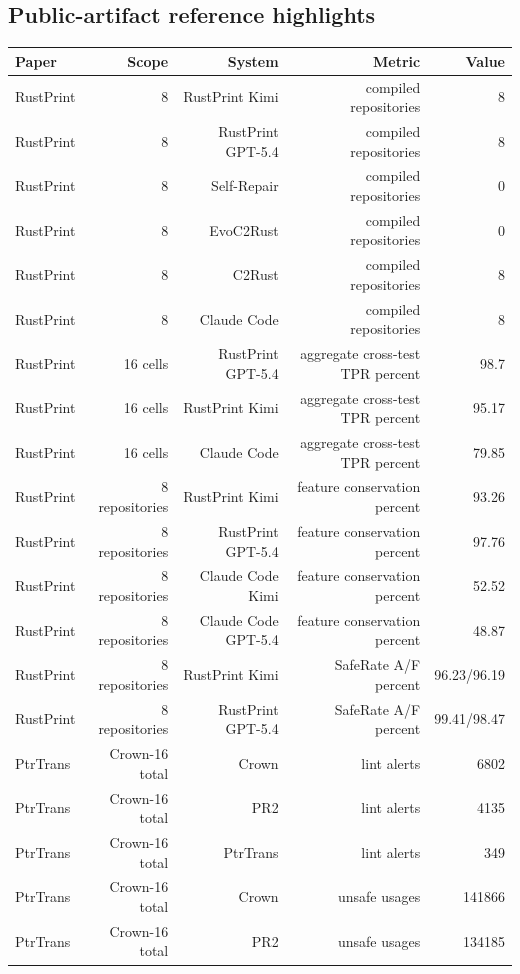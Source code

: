 \documentclass{article}
\begin{document}
\subsection*{Public-artifact reference highlights}

\begin{tabular}{lrrrr}
\toprule
Paper & Scope & System & Metric & Value \\
\midrule
RustPrint & 8 & RustPrint Kimi & compiled repositories & 8 \\
RustPrint & 8 & RustPrint GPT-5.4 & compiled repositories & 8 \\
RustPrint & 8 & Self-Repair & compiled repositories & 0 \\
RustPrint & 8 & EvoC2Rust & compiled repositories & 0 \\
RustPrint & 8 & C2Rust & compiled repositories & 8 \\
RustPrint & 8 & Claude Code & compiled repositories & 8 \\
RustPrint & 16 cells & RustPrint GPT-5.4 & aggregate cross-test TPR percent & 98.7 \\
RustPrint & 16 cells & RustPrint Kimi & aggregate cross-test TPR percent & 95.17 \\
RustPrint & 16 cells & Claude Code & aggregate cross-test TPR percent & 79.85 \\
RustPrint & 8 repositories & RustPrint Kimi & feature conservation percent & 93.26 \\
RustPrint & 8 repositories & RustPrint GPT-5.4 & feature conservation percent & 97.76 \\
RustPrint & 8 repositories & Claude Code Kimi & feature conservation percent & 52.52 \\
RustPrint & 8 repositories & Claude Code GPT-5.4 & feature conservation percent & 48.87 \\
RustPrint & 8 repositories & RustPrint Kimi & SafeRate A/F percent & 96.23/96.19 \\
RustPrint & 8 repositories & RustPrint GPT-5.4 & SafeRate A/F percent & 99.41/98.47 \\
PtrTrans & Crown-16 total & Crown & lint alerts & 6802 \\
PtrTrans & Crown-16 total & PR2 & lint alerts & 4135 \\
PtrTrans & Crown-16 total & PtrTrans & lint alerts & 349 \\
PtrTrans & Crown-16 total & Crown & unsafe usages & 141866 \\
PtrTrans & Crown-16 total & PR2 & unsafe usages & 134185 \\

\end{tabular}
\end{document}
